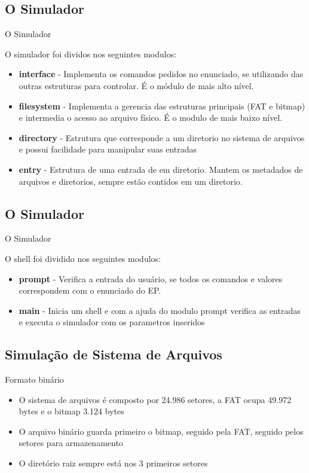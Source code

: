 \documentclass{beamer}
\begin{document}
\subsection{O Simulador}
\begin{frame}{O Simulador}
\par O simulador foi dividos nos seguintes modulos:
\vskip 1cm
\begin{itemize}
\setlength\itemsep{1em}
\item {\bf interface} - Implementa os comandos pedidos no enunciado, se utilizando das outras estruturas para controlar. É o módulo de mais alto nível.
\item {\bf filesystem } - Implementa a gerencia das estruturas principais (FAT e bitmap) e intermedia o acesso ao arquivo físico. É o modulo de mais baixo nível.
\item {\bf directory } - Estrutura que corresponde a um diretorio no sistema de arquivos e possui facilidade para manipular suas entradas
\item {\bf entry } - Estrutura de uma entrada de em diretorio. Mantem os metadados de arquivos e diretorios, sempre estão contidos em um diretorio.
\end{itemize}
\end{frame}

\subsection{O Simulador}
\begin{frame}{O Simulador}
\par O shell foi dividido nos seguintes modulos:
\vskip 1cm
\begin{itemize}
\setlength\itemsep{1em}
\item {\bf prompt} - Verifica a entrada do usuário, se todos os comandos e valores correspondem com o enunciado do EP.
\item {\bf main} - Inicia um shell e com a ajuda do modulo prompt verifica as entradas e executa o simulador com os parametros inseridos
\end{itemize}
\end{frame}

\subsection{Simulação de Sistema de Arquivos}
\begin{frame}{Formato binário}
\begin{itemize}
\setlength\itemsep{1em}
\item \par O sistema de arquivos é composto por 24.986 setores, a FAT ocupa 49.972 bytes e o bitmap 3.124 bytes

\item \par O arquivo binário guarda primeiro o bitmap, seguido pela FAT, seguido pelos setores para armazenamento

\item \par O diretório raiz sempre está nos 3 primeiros setores
\end{itemize}
\end{frame}
\end{document}
